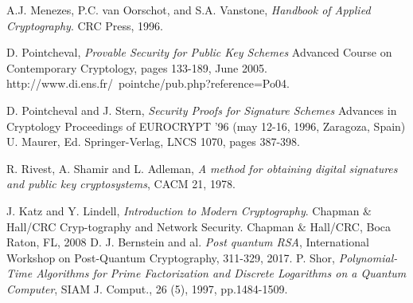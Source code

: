 \documentclass[a4paper,11pt]{article}
\begin{document}
\begin{thebibliography}{10}
 A.J. Menezes, P.C. van Oorschot, and S.A. Vanstone, \emph{Handbook of Applied Cryptography}. CRC Press, 1996.

 D. Pointcheval, \emph{Provable Security for Public Key Schemes} Advanced Course on Contemporary Cryptology, pages 133-189, June 2005. http://www.di.ens.fr/~pointche/pub.php?reference=Po04.


 D. Pointcheval and J. Stern, \emph{Security Proofs for Signature Schemes} Advances in Cryptology  Proceedings of EUROCRYPT '96 (may 12-16, 1996, Zaragoza, Spain) U. Maurer, Ed. Springer-Verlag, LNCS 1070, pages 387-398.

 R. Rivest, A. Shamir and L. Adleman, \emph{A method for obtaining digital signatures and public key cryptosystems}, CACM 21, 1978.

 J. Katz and Y. Lindell, \emph{Introduction to Modern Cryptography}. Chapman $\&$ Hall/CRC Cryp-tography and Network Security. Chapman $\&$ Hall/CRC, Boca Raton, FL, 2008
D. J. Bernstein and al.
\emph{Post quantum RSA},
International Workshop on Post-Quantum Cryptography, 311-329, 2017.
 P. Shor,
\emph{ Polynomial-Time Algorithms for Prime Factorization and Discrete Logarithms on a Quantum Computer},  SIAM J. Comput., 26 (5), 1997, pp.1484-1509. 
\end{thebibliography}
\end{document}
